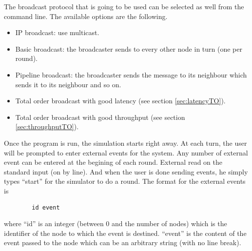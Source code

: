 \documentclass[a4paper]{article}
\begin{document}
        The broadcast protocol that is going to be used can be selected as well from
        the command line. The available options are the following.
        \begin{itemize}
            \item IP broadcast: use multicast.
            \item Basic broadcast: the broadcaster sends to every other node in turn
                (one per round).
            \item Pipeline broadcast: the broadcaster sends the message to its neighbour
                which sends it to its neighbour and so on.
            \item Total order broadcast with good latency (see section
                \ref{sec:latencyTO}).
            \item Total order broadcast with good throughput (see section
                \ref{sec:throughputTO}).
        \end{itemize}

        Once the program is run, the simulation starts right away. At each turn, the
        user will be prompted to enter external events for the system. Any number of
        external event can be entered at the begining of each round. External read on
        the standard input (on by line). And when the user is done sending events, he
        simply types ``start'' for the simulator to do a round. The format for the
        external events is
        \begin{lstlisting}
        id event
        \end{lstlisting}
        where ``id'' is an integer (between 0 and the number of nodes) which is the identifier of the node to which the
        event is destined. ``event'' is the content of the event passed to the
        node which can be an
        arbitrary string (with no line break).
\end{document}
